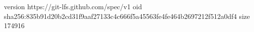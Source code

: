version https://git-lfs.github.com/spec/v1
oid sha256:835b91d20b2cd31f9aaf27133c4c666f5a45563fe4fe464b2697212f512a0df4
size 174916
